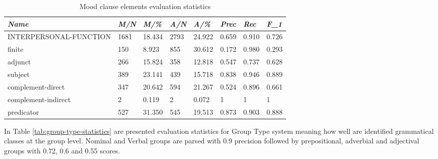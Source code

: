\begin{table}[H]
	\centering
	\begin{tabulary}{\linewidth}{|L|l|l|l|l|l|l|l|}
		\hline
		\textit{Name}          & \textit{M/N} & \textit{M/\%} & \textit{A/N} & \textit{A/\%} & \textit{Prec} & \textit{Rec} & \textit{F_{1}} \\ \hline
		INTERPERSONAL-FUNCTION & 1681       & 18.434          & 2793        & 24.922           & 0.659              & 0.910           & 0.726       \\ \hline
		finite                 & 150        & 8.923           & 855         & 30.612           & 0.172              & 0.980           & 0.293       \\ \hline
		adjunct                & 266        & 15.824          & 358         & 12.818           & 0.547              & 0.737           & 0.628       \\ \hline
		subject                & 389        & 23.141          & 439         & 15.718           & 0.838              & 0.946           & 0.889       \\ \hline
		complement-direct      & 347        & 20.642          & 594         & 21.267           & 0.524              & 0.896           & 0.661       \\ \hline
		complement-indirect    & 2          & 0.119           & 2           & 0.072            & 1              & 1           & 1      \\ \hline
		predicator             & 527        & 31.350          & 545         & 19.513           & 0.873              & 0.903           & 0.888       \\ \hline
	\end{tabulary}
	\caption{Mood clause elements evaluation statistics}
	\label{tab:interpersonal-statistics}
\end{table}

In Table \ref{tab:group-type-statistics} are presented evaluation statistics for Group Type system meaning how well are identified grammatical classes at the group level. Nominal and Verbal groups are parsed with 0.9 precision followed by prepositional, adverbial and adjectival groups with 0.72, 0.6 and 0.55 scores.

